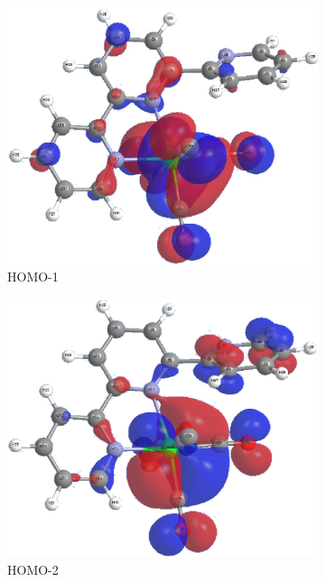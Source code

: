 \begin{figure}[!ht]
\begin{subfigure}[b]{0.31\textwidth}
  \includegraphics[clip=true, width=\textwidth, keepaspectratio]{images/mos/5h-1.eps}
  \caption{HOMO-1}
 \end{subfigure}
 \begin{subfigure}[b]{0.31\textwidth}
  \includegraphics[clip=true, width=\textwidth, keepaspectratio]{images/mos/5h-2.eps}
  \caption{HOMO-2}
 \end{subfigure}
 \begin{subfigure}[b]{0.31\textwidth}

\end{subfigure}
\end{figure}
